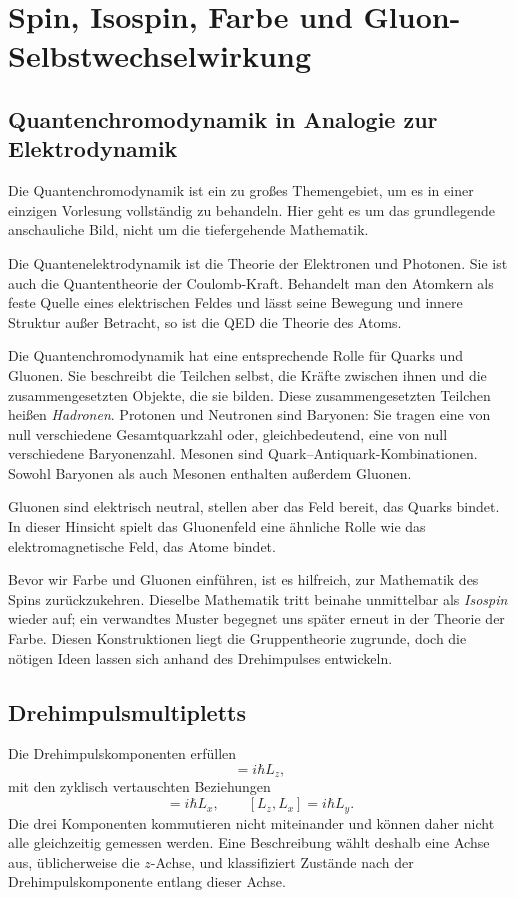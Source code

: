 \chapter{Spin, Isospin, Farbe und Gluon-Selbstwechselwirkung}

\section{Quantenchromodynamik in Analogie zur Elektrodynamik}

Die Quantenchromodynamik ist ein zu großes Themengebiet, um es in einer einzigen Vorlesung vollständig zu behandeln. Hier geht es um das grundlegende anschauliche Bild, nicht um die tiefergehende Mathematik.

Die Quantenelektrodynamik ist die Theorie der Elektronen und Photonen. Sie ist auch die Quantentheorie der Coulomb-Kraft. Behandelt man den Atomkern als feste Quelle eines elektrischen Feldes und lässt seine Bewegung und innere Struktur außer Betracht, so ist die QED die Theorie des Atoms.

Die Quantenchromodynamik hat eine entsprechende Rolle für Quarks und Gluonen. Sie beschreibt die Teilchen selbst, die Kräfte zwischen ihnen und die zusammengesetzten Objekte, die sie bilden. Diese zusammengesetzten Teilchen heißen \emph{Hadronen}. Protonen und Neutronen sind Baryonen: Sie tragen eine von null verschiedene Gesamtquarkzahl oder, gleichbedeutend, eine von null verschiedene Baryonenzahl. Mesonen sind Quark--Antiquark-Kombinationen. Sowohl Baryonen als auch Mesonen enthalten außerdem Gluonen.

Gluonen sind elektrisch neutral, stellen aber das Feld bereit, das Quarks bindet. In dieser Hinsicht spielt das Gluonenfeld eine ähnliche Rolle wie das elektromagnetische Feld, das Atome bindet.

Bevor wir Farbe und Gluonen einführen, ist es hilfreich, zur Mathematik des Spins zurückzukehren. Dieselbe Mathematik tritt beinahe unmittelbar als \emph{Isospin} wieder auf; ein verwandtes Muster begegnet uns später erneut in der Theorie der Farbe. Diesen Konstruktionen liegt die Gruppentheorie zugrunde, doch die nötigen Ideen lassen sich anhand des Drehimpulses entwickeln.

\section{Drehimpulsmultipletts}

Die Drehimpulskomponenten erfüllen
\begin{equation}
[L_x,L_y]=i\hbar L_z,
\end{equation}
mit den zyklisch vertauschten Beziehungen
\begin{equation}
[L_y,L_z]=i\hbar L_x,
\qquad
[L_z,L_x]=i\hbar L_y.
\end{equation}
Die drei Komponenten kommutieren nicht miteinander und können daher nicht alle gleichzeitig gemessen werden. Eine Beschreibung wählt deshalb eine Achse aus, üblicherweise die \(z\)-Achse, und klassifiziert Zustände nach der Drehimpulskomponente entlang dieser Achse.


